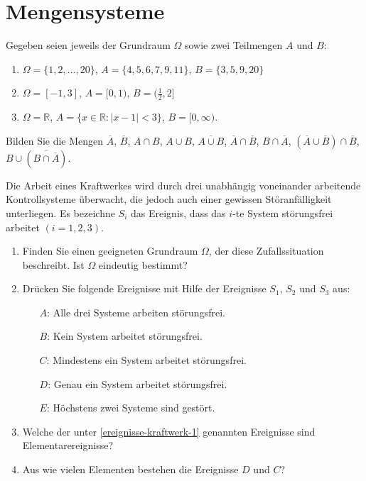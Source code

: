 \section{Mengensysteme}

Gegeben seien jeweils der Grundraum $\Omega$ sowie zwei Teilmengen
$A$ und $B$:
\begin{enumerate}
\item $\Omega=\{1,2,...,20\}$, $A=\{4,5,6,7,9,11\}$, $B=\{3,5,9,20\}$
\item $\Omega=[-1,3]$, $A=[0,1)$, $B=(\frac{1}{2},2]$
\item $\Omega=\mathbb R$, $A=\{x\in \mathbb R: |x-1|<3\}$, $B=[0,\infty)$.
\end{enumerate}
Bilden Sie die Mengen $\overline{A}$, $\overline{B}$, $A\cap B$, $A\cup B$,
$\overline{ A\cup B}$, $\overline{A}\cap\overline{B}$, $B\cap\overline{A}$,
$(\overline{A}\cup\overline{B})\cap\overline{B}$,
$B\cup(\overline{B\cap\overline{A}})$.


Die Arbeit eines Kraftwerkes wird durch drei unabhängig voneinander arbeitende
Kontrollsysteme überwacht, die jedoch auch einer gewissen Störanfälligkeit
unterliegen. Es bezeichne $S_i$ das Ereignis, dass das $i$-te System
störungsfrei arbeitet $(i=1,2,3)$.
\begin{enumerate}
    \item Finden Sie einen geeigneten Grundraum $\Omega$, der diese
        Zufallssituation beschreibt. Ist $\Omega$ eindeutig bestimmt?
    \item Drücken Sie folgende Ereignisse mit Hilfe der Ereignisse $S_1$, $S_2$
        und $S_3$ aus:
        \begin{itemize}
            \item[$A$:] Alle drei Systeme arbeiten störungsfrei.
            \item[$B$:] Kein System arbeitet störungsfrei.
            \item[$C$:] Mindestens ein System arbeitet störungsfrei.
            \item[$D$:] Genau ein System arbeitet störungsfrei.
            \item[$E$:] Höchstens zwei Systeme sind gestört.
        \end{itemize}\label{ereignisse-kraftwerk-1}
    \item Welche der unter \ref{ereignisse-kraftwerk-1} genannten Ereignisse
        sind Elementarereignisse?
    \item Aus wie vielen Elementen bestehen die Ereignisse $D$ und $C$?
\end{enumerate}

